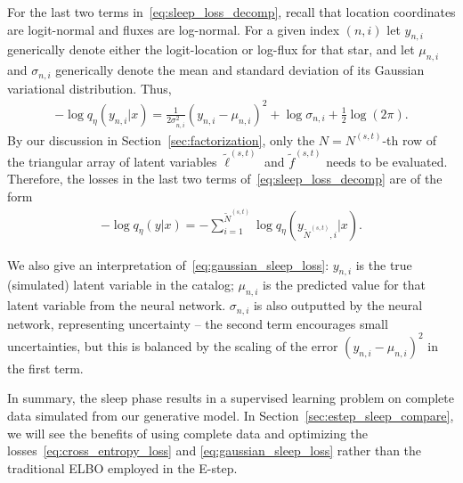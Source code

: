 For the last two terms in~\eqref{eq:sleep_loss_decomp}, recall that location coordinates are logit-normal and fluxes are log-normal. For a given index $(n,i)$ let $y_{n,i}$ generically denote either the 
logit-location or log-flux for that star, 
and let $\mu_{n,i}$ and $\sigma_{n,i}$ generically denote the mean and standard deviation of its Gaussian variational distribution. Thus,
\begin{align}
    -\log q_\eta(y_{n,i} | x) = 
        \frac{1}{2\sigma^2_{n,i}}(y_{n,i} - \mu_{n,i})^2
         + \log\sigma_{n,i}
         + \frac{1}{2}\log(2\pi).
         \label{eq:gaussian_sleep_loss}
\end{align}
By our discussion in Section~\ref{sec:factorization}, 
only the $N = N^{(s,t)}$-th row of the triangular 
array of latent variables $\tilde \ell^{(s,t)}$ and $\tilde f^{(s,t)}$ needs to be evaluated. Therefore, the losses in the last two terms of~\eqref{eq:sleep_loss_decomp} are of the form 
\begin{align}
    -\log q_\eta(y | x) = -\sum_{i = 1}^{\tilde N^{(s,t)}} \log q_\eta(y_{\tilde N^{(s,t)},i} | x). 
\end{align}


We also give an interpretation of~\eqref{eq:gaussian_sleep_loss}: 
$y_{n,i}$ is the true (simulated) latent variable in the catalog; 
$\mu_{n,i}$ is the predicted value for that latent variable from the neural network. 
$\sigma_{n,i}$ is also outputted by the neural network, representing uncertainty -- the second term encourages small uncertainties, but this is 
balanced by the scaling of the error $(y_{n,i} - \mu_{n,i})^2$ in the first term. 

In summary, the sleep phase results in a supervised learning problem on complete data simulated from our generative model. In Section~\ref{sec:estep_sleep_compare}, we will see the benefits of using complete data and optimizing the losses~\eqref{eq:cross_entropy_loss} and \eqref{eq:gaussian_sleep_loss}  rather than the traditional ELBO employed in the E-step. 


